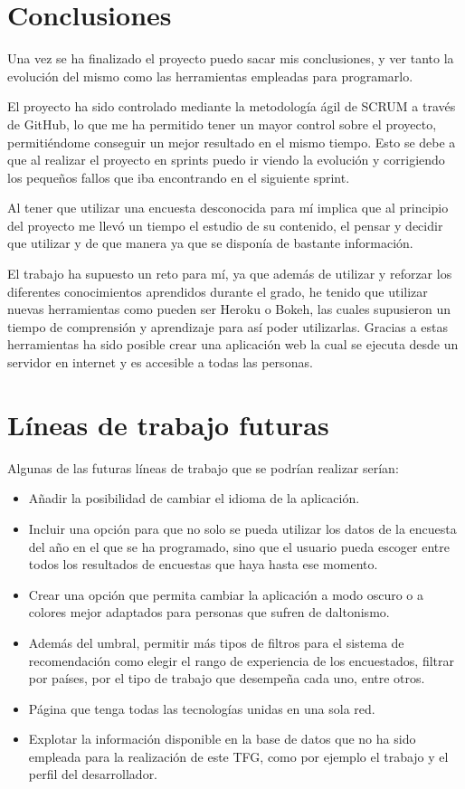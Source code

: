 
\section{Conclusiones}
Una vez se ha finalizado el proyecto puedo sacar mis conclusiones, y ver tanto la evolución del mismo como las herramientas empleadas para programarlo.

El proyecto ha sido controlado mediante la metodología ágil de SCRUM a través de GitHub, lo que me ha permitido tener un mayor control sobre el proyecto, permitiéndome conseguir un mejor resultado en el mismo tiempo. Esto se debe a que al realizar el proyecto en sprints puedo ir viendo la evolución y corrigiendo los pequeños fallos que iba encontrando en el siguiente sprint.

Al tener que utilizar una encuesta desconocida para mí implica que al principio del proyecto me llevó un tiempo el estudio de su contenido, el pensar y decidir que utilizar y de que manera ya que se disponía de bastante información.

El trabajo ha supuesto un reto para mí, ya que además de utilizar y reforzar los diferentes conocimientos aprendidos durante el grado, he tenido que utilizar nuevas herramientas como pueden ser Heroku o Bokeh, las cuales supusieron un tiempo de comprensión y aprendizaje para así poder utilizarlas. Gracias a estas herramientas ha sido posible crear una aplicación web la cual se ejecuta desde un servidor en internet y es accesible a todas las personas.


\section{Líneas de trabajo futuras}
Algunas de las futuras líneas de trabajo que se podrían realizar serían:

\begin{itemize}
    \item Añadir la posibilidad de cambiar el idioma de la aplicación.
    \item Incluir una opción para que no solo se pueda utilizar los datos de la encuesta del año en el que se ha programado, sino que el usuario pueda escoger entre todos los resultados de encuestas que haya hasta ese momento.
    \item Crear una opción que permita cambiar la aplicación a modo oscuro o a colores mejor adaptados para personas que sufren de daltonismo.
    \item Además del umbral, permitir más tipos de filtros para el sistema de recomendación como elegir el rango de experiencia de los encuestados, filtrar por países, por el tipo de trabajo que desempeña cada uno, entre otros.
    \item Página que tenga todas las tecnologías unidas en una sola red.
    \item Explotar la información disponible en la base de datos que no ha sido empleada para la realización de este TFG, como por ejemplo el trabajo y el perfil del desarrollador.
\end{itemize}
